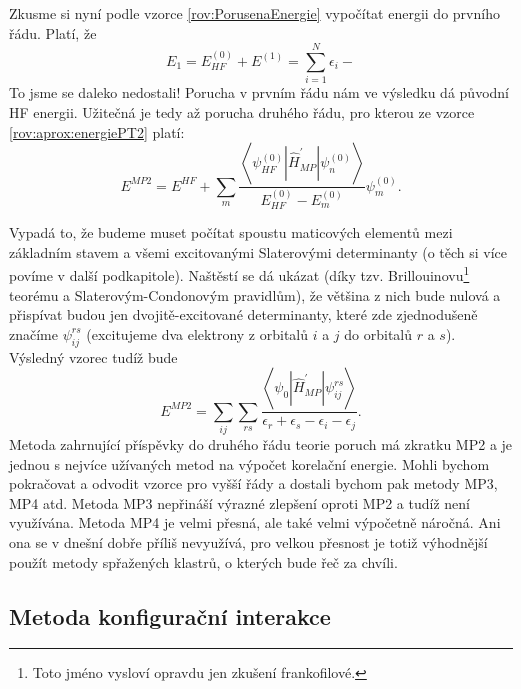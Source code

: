 Zkusme si nyní podle vzorce \eqref{rov:PorusenaEnergie} vypočítat energii do prvního řádu. Platí, že
\begin{equation}
E_1=E^{(0)}_{HF} + E^{(1)}= \sum_{i=1}^N \epsilon_i - 
\end{equation}
To jsme se daleko nedostali! Porucha v prvním řádu nám ve výsledku dá původní HF energii.
Užitečná je tedy až porucha druhého řádu, pro kterou ze vzorce \eqref{rov:aprox:energiePT2} platí:
\begin{equation}
E^{MP2} = E^{HF} + \sum_m \frac{\left < \psi^{(0)}_{HF}|\hat{H}^{\prime}_{MP}|\psi_n^{(0)} \right >}{E_{HF}^{(0)}-E_m^{(0)}}\psi_m^{(0)}.
\end{equation}

Vypadá to, že budeme muset počítat spoustu maticových elementů mezi základním stavem a všemi excitovanými Slaterovými determinanty (o těch si více povíme v další podkapitole). Naštěstí se dá ukázat (díky tzv. Brillouinovu\footnote{Toto jméno vysloví opravdu jen zkušení frankofilové.} teorému a Slaterovým-Condonovým pravidlům), že většina z nich bude nulová a přispívat budou jen dvojitě-excitované determinanty, které zde zjednodušeně značíme $\psi_{ij}^{rs}$ (excitujeme dva elektrony z orbitalů $i$ a $j$ do orbitalů $r$ a $s$). Výsledný vzorec tudíž bude
\begin{equation}
E^{MP2}=\sum_{ij} \sum_{rs} \frac{\left < \psi_0 | \hat{H}^{\prime}_{MP} | \psi_{ij}^{rs} \right > }{\epsilon_r+\epsilon_s-\epsilon_i-\epsilon_j} .
\end{equation}
Metoda zahrnující příspěvky do druhého řádu teorie poruch má zkratku MP2 a je jednou s nejvíce užívaných metod na výpočet korelační energie. Mohli bychom pokračovat a odvodit vzorce pro vyšší řády a dostali bychom pak metody MP3, MP4 atd. 
Metoda MP3 nepřináší výrazné zlepšení oproti MP2 a tudíž není využívána. Metoda MP4 je velmi přesná, ale také velmi výpočetně náročná. Ani ona se v dnešní dobře příliš nevyužívá, pro velkou přesnost je totiž výhodnější použít metody spřažených klastrů, o kterých bude řeč za chvíli.


\subsection{Metoda konfigurační interakce}

